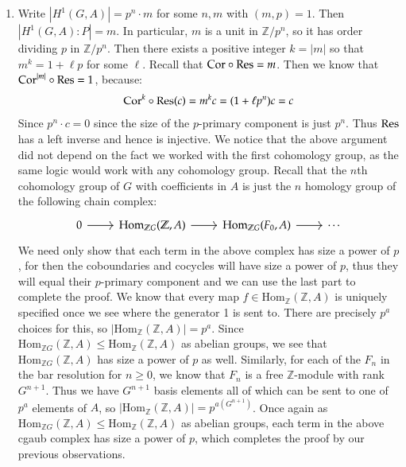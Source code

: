 \documentclass[12pt]{article}
\theoremstyle{definitionstyle}
\def\mbb#1{\mathbb{#1}}
\newcommand{\Z}{\mbb Z}
\newcommand{\Hom}{\mathrm{Hom}}
\newcommand{\Cor}{\mathrm{Cor}}
\begin{document}
\begin{enumerate}
        \item Write $|H^1(G,A)| = p^n \cdot m$ for some $n,m$ with $(m, p) = 1$. Then $|H^1(G,A) : P| = m$. In particular, $m$ is a unit in $\Z/p^n$, so it has order dividing $p$ in $\Z/p^n$. Then there exists a positive integer $k = |m|$ so that $m^k = 1 + \ell p$ for some $\ell$. Recall that $\Cor \circ \Res = m$. Then we know that $\Cor^{|m|} \circ \Res = 1$, because:
        \begin{align*}
            \Cor^{k} \circ \Res(c) = m^{k} c = (1 + \ell p^n)c = c
        \end{align*}
        Since $p^n \cdot c = 0$ since the size of the $p$-primary component is just $p^n$. Thus $\Res$ has a left inverse and hence is injective. We notice that the above argument did not depend on the fact we worked with the first cohomology group, as the same logic would work with any cohomology group. Recall that the $n$th cohomology group of $G$ with coefficients in $A$ is just the $n$ homology group of the following chain complex:
        \[\begin{tikzcd}
            0 & {\Hom_{\Z G}(\Z, A)} & {\Hom_{\Z G}(F_0, A)} & \cdots
            \arrow[from=1-1, to=1-2]
            \arrow[from=1-2, to=1-3]
            \arrow[from=1-3, to=1-4]
        \end{tikzcd}\]
        We need only show that each term in the above complex has size a power of $p$, for then the coboundaries and cocycles will have size a power of $p$, thus they will equal their $p$-primary component and we can use the last part to complete the proof. We know that every map $f \in \Hom_\Z(\Z, A)$ is uniquely specified once we see where the generator 1 is sent to. There are precisely $p^a$ choices for this, so $|\Hom_{\Z}(\Z, A)| = p^a$. Since $\Hom_{\Z G}(\Z, A) \leq \Hom_{\Z}(\Z, A)$ as abelian groups, we see that $\Hom_{\Z G}(\Z, A)$ has size a power of $p$ as well. Similarly, for each of the $F_n$ in the bar resolution for $n \geq 0$, we know that $F_n$ is a free $\Z$-module with rank $G^{n+1}$. Thus we have $G^{n+1}$ basis elements all of which can be sent to one of $p^a$ elements of $A$, so $|\Hom_{\Z}(\Z, A)| = p^{a(G^{n+1})}$. Once again as $\Hom_{\Z G}(\Z, A) \leq \Hom_{\Z}(\Z, A)$ as abelian groups, each term in the above cgaub complex has size a power of $p$, which completes the proof by our previous observations.


\end{enumerate}
\end{document}
